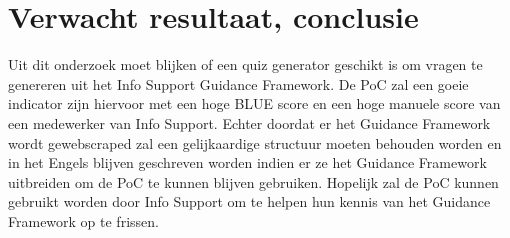 

\section{Verwacht resultaat, conclusie}%
\label{sec:verwachte_resultaten}
Uit dit onderzoek moet blijken of een quiz generator geschikt is om vragen te genereren uit het Info Support Guidance Framework. De PoC zal een goeie indicator zijn hiervoor met een hoge BLUE score en een hoge manuele score van een medewerker van Info Support. Echter doordat er het Guidance Framework wordt gewebscraped zal een gelijkaardige structuur moeten behouden worden en in het Engels blijven geschreven worden indien er ze het Guidance Framework uitbreiden om de PoC te kunnen blijven gebruiken. Hopelijk zal de PoC kunnen gebruikt worden door Info Support om te helpen hun kennis van het Guidance Framework op te frissen.




